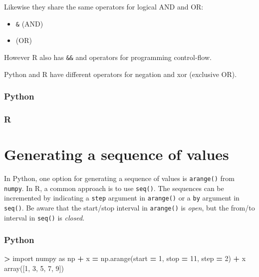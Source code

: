 \documentclass[
]{book}
\newenvironment{Shaded}{\begin{snugshade}}{\end{snugshade}}
\newcommand{\DecValTok}[1]{\textcolor[rgb]{0.00,0.00,0.81}{#1}}
\newcommand{\ImportTok}[1]{#1}
\newcommand{\NormalTok}[1]{#1}
\newcommand{\OperatorTok}[1]{\textcolor[rgb]{0.81,0.36,0.00}{\textbf{#1}}}
\providecommand{\tightlist}{%
  \setlength{\itemsep}{0pt}\setlength{\parskip}{0pt}}
\begin{document}
Likewise they share the same operators for logical AND and OR:

\begin{itemize}
\tightlist
\item
  \texttt{\&} (AND)
\item
  \texttt{\textbar{}} (OR)
\end{itemize}

However R also has \texttt{\&\&} and \texttt{\textbar{}\textbar{}} operators for programming control-flow.

Python and R have different operators for negation and xor (exclusive OR).

\hypertarget{python-4}{%
\subsubsection*{Python}\label{python-4}}

\hypertarget{r-4}{%
\subsubsection*{R}\label{r-4}}

\hypertarget{generating-a-sequence-of-values}{%
\section{Generating a sequence of values}\label{generating-a-sequence-of-values}}

In Python, one option for generating a sequence of values is \texttt{arange()} from \texttt{numpy}. In R, a common approach is to use \texttt{seq()}. The sequences can be incremented by indicating a \texttt{step} argument in \texttt{arange()} or a \texttt{by} argument in \texttt{seq()}. Be aware that the start/stop interval in \texttt{arange()} is \emph{open}, but the from/to interval in \texttt{seq()} is \emph{closed}.

\hypertarget{python-5}{%
\subsubsection*{Python}\label{python-5}}

\begin{Shaded}
\begin{Highlighting}[]
\OperatorTok{\textgreater{}} \ImportTok{import}\NormalTok{ numpy }\ImportTok{as}\NormalTok{ np}
\OperatorTok{+}\NormalTok{ x }\OperatorTok{=}\NormalTok{ np.arange(start }\OperatorTok{=} \DecValTok{1}\NormalTok{, stop }\OperatorTok{=} \DecValTok{11}\NormalTok{, step }\OperatorTok{=} \DecValTok{2}\NormalTok{)}
\OperatorTok{+}\NormalTok{ x}
\NormalTok{array([}\DecValTok{1}\NormalTok{, }\DecValTok{3}\NormalTok{, }\DecValTok{5}\NormalTok{, }\DecValTok{7}\NormalTok{, }\DecValTok{9}\NormalTok{])}
\end{Highlighting}
\end{Shaded}
\end{document}
